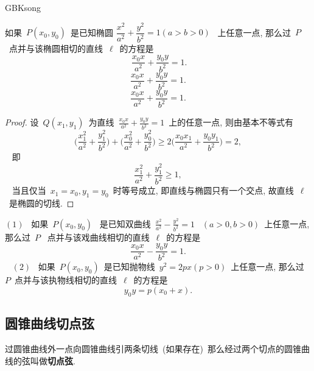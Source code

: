 \documentclass[a4paper, 12pt, twoside]{ctexart}
\begin{document}
\begin{CJK*}{GBK}{song}
    \begin{theo}[椭圆切线方程]
        如果~$P(x_0, y_0)$~是已知椭圆 $\dfrac{x^2}{a^2}+\dfrac{y^2}{b^2}=1(a>b>0)$~ 上任意一点, 那么过~$P$~点并与该椭圆相切的直线~$\ell$~的方程是
            $$~\frac{x_0x}{a^2}+\frac{y_0y}{b^2}=1.$$
            \[
            \frac{x_0x}{a^2}+\frac{y_0y}{b^2}=1.
            \]
            \begin{equation*}
            \frac{x_0x}{a^2}+\frac{y_0y}{b^2}=1.
            \end{equation*}
    \end{theo}
    \begin{proof}
        设~$Q(x_1, y_1)$~为直线~$\frac{x_0x}{a^2}+\frac{y_0y}{b^2}=1$~上的任意一点, 则由基本不等式有
        $$~\Big(\frac{x_1^2}{a^2}+\frac{y_1^2}{b^2}\Big) +\Big(\frac{x_0^2}{a^2}+\frac{y_0^2}{b^2}\Big) \ge 2\Big(\frac{x_0x_1}{a^2}+\frac{y_0y_1}{b^2}\Big)=2,~$$~
        即
            $$~\frac{x_1^2}{a^2}+\frac{y_1^2}{b^2} \ge 1,~$$~
        当且仅当~$x_1=x_0,y_{1}=y_0$~时等号成立, 即直线与椭圆只有一个交点,  故直线~$\ell$~是椭圆的切线.
    \end{proof}
    \begin{coro}[双曲线和抛物线的切线方程] $(1)$~ 如果~$P(x_0, y_0)$~ 是已知双曲线~$\frac{x^2}{a^2}-\frac{y^2}{b^2}=1$~ $(a>0, b>0)$~上任意一点, 那么过~$P$~ 点并与该戏曲线相切的直线~$\ell$~的方程是
            $$~\frac{x_0x}{a^2}-\frac{y_0y}{b^2}=1.~$$~
        \indent $(2)$~ 如果~$P(x_0, y_0)$~是已知抛物线~$y^2=2px(p>0)$~上任意一点, 那么过~$P$~点并与该执物线相切的直线~$\ell$~的方程是
        $$~y_0y=p(x_0+x).~$$
    \end{coro}
\subsection{圆锥曲线切点弦}
    \begin{defi}[切点弦]
     过圆锥曲线外一点向圆锥曲线引两条切线~(如果存在)~那么经过两个切点的圆锥曲线的弦叫做\textbf{切点弦}.
    \end{defi}


\end{CJK*}
\end{document}
